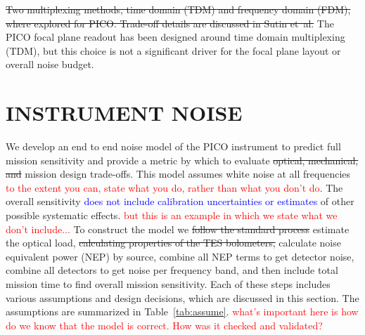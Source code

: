 \documentclass[]{spie}  %
\newcommand{\comr}[1]{\textcolor{red}{#1}}
\newcommand{\comb}[1]{\textcolor{blue}{#1}}
\begin{document}
\sout{Two multiplexing methods, time domain (TDM) and frequency domain (FDM), where explored for PICO. Trade-off details are discussed in Sutin et~al.\cite{brian_spie}}
The PICO focal plane readout has been designed around time domain multiplexing (TDM), but this choice is not a 
significant driver for the focal plane layout or overall noise budget. 


\section{INSTRUMENT NOISE}
\label{sec:noise}

We develop an end to end noise model of the PICO instrument to predict full mission sensitivity and 
provide a metric by which to evaluate \sout{optical, mechanical, and } mission design trade-offs.  This model assumes white noise
at all frequencies \comr{to the extent you can, state what you do, rather than what you don't do}. 
The overall sensitivity \comb{does not include calibration uncertainties or estimates} of other possible 
systematic effects. \comr{but this is an example in which we state what we don't include...} 
To construct the model we \sout{follow the standard process\cite{suzuki2013_thesis,aubin2013_thesis}} estimate the 
optical load, \sout{calculating properties of the TES bolometers,} calculate noise equivalent power (NEP) by source, 
combine all NEP terms to get detector noise, combine all detectors to get noise per frequency band, and then 
include total mission time to find overall mission sensitivity.  
Each of these steps includes various assumptions and design decisions, 
which are discussed in this section.  The assumptions are summarized in Table~\ref{tab:assume}.
\comr{what's important here is how do we know that the model is correct. How was it checked and validated?}
\end{document}
